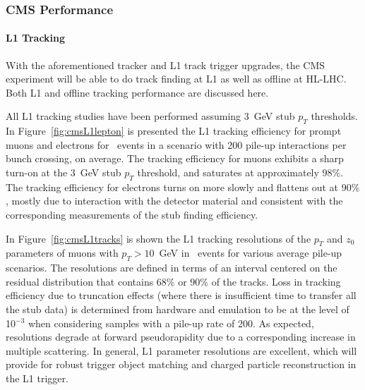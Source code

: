 \subsubsection{CMS Performance}

\paragraph{L1 Tracking}

With the aforementioned tracker and L1 track trigger upgrades, the CMS experiment will be able to do track finding at L1 as well as offline at HL-LHC. Both L1 and offline tracking performance are discussed here. 

All L1 tracking studies have been performed assuming 3~GeV stub $p_T$ thresholds. In Figure~\ref{fig:cmsL1lepton} is presented the L1 tracking efficiency for prompt muons and electrons for \ttbar~events in a scenario with 200 pile-up interactions per bunch crossing, on average. The tracking efficiency for muons exhibits a sharp turn-on at the 3~GeV stub $p_T$ threshold, and saturates at approximately $98\%$. The tracking efficiency for electrons turns on more slowly and flattens out at $90\%$, mostly due to interaction with the detector material and consistent with the corresponding measurements of the stub finding efficiency.

In Figure~\ref{fig:cmsL1tracks} is shown the L1 tracking resolutions of the $p_T$ and $z_0$ parameters of muons with $p_T > 10$~GeV in \ttbar~events for various average pile-up scenarios. The resolutions are defined in terms of an interval centered on the residual distribution that contains $68\%$ or $90\%$ of the tracks. Loss in tracking efficiency due to truncation effects (where there is insufficient time to transfer all the stub data) is determined from hardware and emulation to be at the level of 10$^{-3}$ when considering \ttbar samples with a pile-up rate of 200. As expected, resolutions degrade at forward pseudorapidity due to a corresponding increase in multiple scattering. In general, L1 parameter resolutions are excellent, which will provide for robust trigger object matching and charged particle reconstruction in the L1 trigger.

